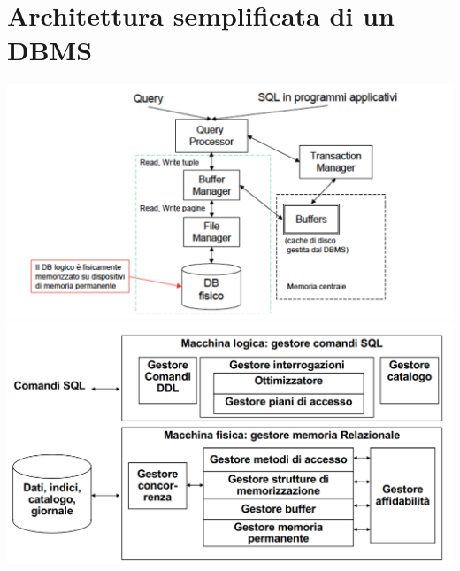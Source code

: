 \documentclass[10pt]{book}
\begin{document}
\section{Architettura semplificata di un DBMS}
\begin{center}
	\includegraphics[scale=0.45]{dbmsstrutt.png}\\
	\includegraphics[scale=0.45]{dbmslogfis.png}
\end{center}
\end{document}

